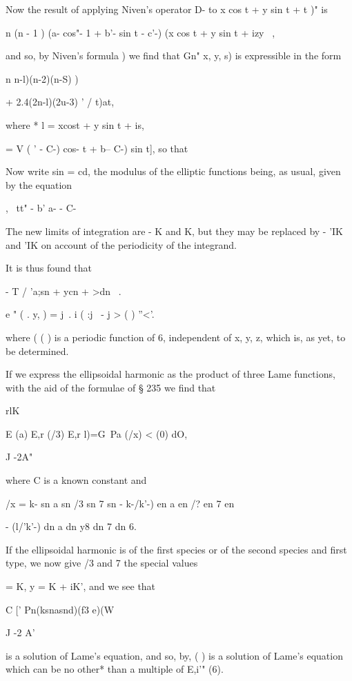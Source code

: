 {{{{{{{{Now the result of applying Niven's operator D- to x cos t + y sin t +
t )" is

n (n - 1 ) (a- cos"- 1 + b'- sin t - c'-) (x cos t + y sin t + izy ~,

and so, by Niven's formula ) we find that Gn" x, y, s) is
expressible in the form

n n-l)(n-2)(n-S) )

+ 2.4(2n-l)(2u-3) '  / t)at,

%
%

where * l = xcost + y sin t + is,

  = V ( ' - C-) cos- t + b-- C-) sin t], so that

Now write sin = cd, the modulus of the elliptic functions being, as
usual, given by the equation

, \ tt" - b' a- - C-

The new limits of integration are - K and K, but they may be replaced
by - 'IK and 'IK on account of the periodicity of the integrand.

It is thus found that

 - T / 'a;sn + ycn + >dn \ .

e " ( . y, ) = j\ . i ( :j \ - j > ( ) ''<'.

where ( ( ) is a periodic function of 6, independent of x, y, z, which
is, as yet, to be determined.

If we express the ellipsoidal harmonic as the product of three Lame
functions, with the aid of the formulae of § 235 we find that

rlK

E (a) E,r (/3) E,r l)=G\ Pa (/x) < (0) dO,

J -2A"

where C is a known constant and

/x = k- sn a sn /3 sn 7 sn - k-/k'-) en a en /? en 7 en

- (l/'k'-) dn a dn y8 dn 7 dn 6.

If the ellipsoidal harmonic is of the first species or of the second
species and first type, we now give /3 and 7 the special values

  = K, y = K + iK', and we see that

C [' Pn(ksnasnd)(f3 e)(W

J -2 A'

is a solution of Lame's equation, and so, by, ( ) is a solution
of Lame's equation which can be no other* than a multiple of E,i'"
(6).

}}}}}}}}
